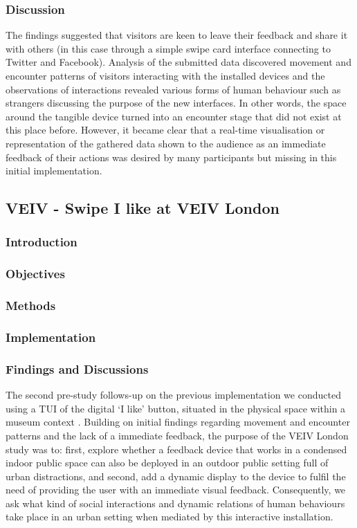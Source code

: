 \subsubsection{Discussion}
The findings suggested that visitors are keen to leave their feedback and share it with others (in this case through a simple swipe card interface connecting to Twitter and Facebook).
Analysis of the submitted data discovered movement and encounter patterns of visitors interacting with the installed devices and the observations of interactions revealed various forms of human behaviour such as strangers discussing the purpose of the new interfaces. 
In other words, the space around the tangible device turned into an encounter stage that did not exist at this place before. However, it became clear that a real-time visualisation or representation of the gathered data shown to the audience as an immediate feedback of their actions was desired by many participants but missing in this initial implementation.


\subsection{VEIV - Swipe I like at VEIV London}


\subsubsection {Introduction} 
\subsubsection {Objectives} 
\subsubsection {Methods}
\subsubsection {Implementation}
\subsubsection {Findings and Discussions}


The second pre-study \cite{Behrens_2013} follows-up on the previous implementation we conducted using a TUI of the digital ‘I like’ button, situated in the physical space within a museum context \cite{Behrens_2011} \cite{Behrens_2011b} . 
Building on initial findings regarding movement and encounter patterns and the lack of a immediate feedback, the purpose of the VEIV London study was to: first, explore whether a feedback device that works in a condensed indoor public space can also be deployed in an outdoor public setting full of urban distractions, and second, add a dynamic display to the device to fulfil the need of providing the user with an immediate visual feedback. 
Consequently, we ask what kind of social interactions and dynamic relations of human behaviours take place in an urban setting when mediated by this interactive installation.


